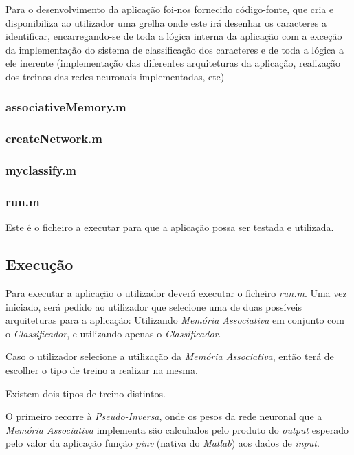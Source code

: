 \documentclass{article}
\begin{document}
Para o desenvolvimento da aplicação foi-nos fornecido código-fonte, que cria e disponibiliza ao utilizador uma grelha onde este irá desenhar os caracteres a identificar, encarregando-se de toda a lógica interna da aplicação com a exceção da implementação do sistema de classificação dos caracteres e de toda a lógica a ele inerente (implementação das diferentes arquiteturas da aplicação, realização dos treinos das redes neuronais implementadas, etc)

\subsubsection{associativeMemory.m}


\subsubsection{createNetwork.m}


\subsubsection{myclassify.m}


\subsubsection{run.m}

Este é o ficheiro a executar para que a aplicação possa ser testada e utilizada.

\pagebreak

\subsection{Execução}

Para executar a aplicação o utilizador deverá executar o ficheiro \emph{run.m}. Uma vez iniciado, será pedido ao utilizador que selecione uma de duas possíveis arquiteturas para a aplicação: Utilizando \emph{Memória Associativa} em conjunto com o \emph{Classificador}, e utilizando apenas o \emph{Classificador}.

Caso o utilizador selecione a utilização da \emph{Memória Associativa}, então terá de escolher o tipo de treino a realizar na mesma.

Existem dois tipos de treino distintos.

O primeiro recorre à \emph{Pseudo-Inversa}, onde os pesos da rede neuronal que a \emph{Memória Associativa} implementa são calculados pelo produto do \emph{output} esperado pelo valor da aplicação função \emph{pinv} (nativa do \emph{Matlab}) aos dados de \emph{input}.
\end{document}
